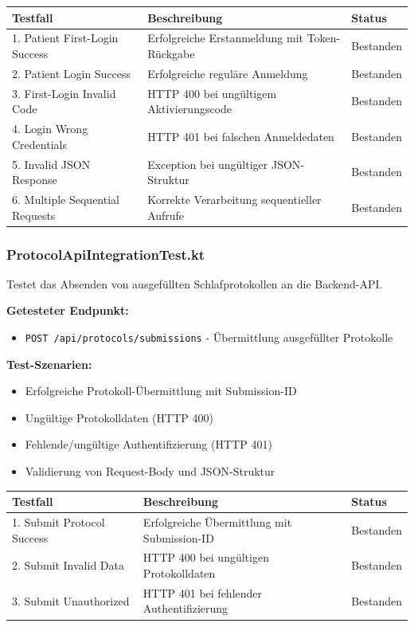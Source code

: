\begin{tabularx}{\textwidth}{|l|X|l|}
\hline
\textbf{Testfall} & \textbf{Beschreibung} & \textbf{Status} \\
\hline
1. Patient First-Login Success & Erfolgreiche Erstanmeldung mit Token-Rückgabe & Bestanden\\
\hline
2. Patient Login Success & Erfolgreiche reguläre Anmeldung & Bestanden\\
\hline
3. First-Login Invalid Code & HTTP 400 bei ungültigem Aktivierungscode & Bestanden\\
\hline
4. Login Wrong Credentials & HTTP 401 bei falschen Anmeldedaten & Bestanden\\
\hline
5. Invalid JSON Response & Exception bei ungültiger JSON-Struktur & Bestanden\\
\hline
6. Multiple Sequential Requests & Korrekte Verarbeitung sequentieller Aufrufe & Bestanden\\
\hline
\end{tabularx}

\subsubsection{ProtocolApiIntegrationTest.kt}
Testet das Absenden von ausgefüllten Schlafprotokollen an die Backend-API.

\textbf{Getesteter Endpunkt:}
\begin{itemize}
  \item \texttt{POST /api/protocols/submissions} - Übermittlung ausgefüllter Protokolle
\end{itemize}

\textbf{Test-Szenarien:}
\begin{itemize}
  \item Erfolgreiche Protokoll-Übermittlung mit Submission-ID
  \item Ungültige Protokolldaten (HTTP 400)
  \item Fehlende/ungültige Authentifizierung (HTTP 401)
  \item Validierung von Request-Body und JSON-Struktur
\end{itemize}

\begin{tabularx}{\textwidth}{|l|X|l|}
\hline
\textbf{Testfall} & \textbf{Beschreibung} & \textbf{Status} \\
\hline
1. Submit Protocol Success & Erfolgreiche Übermittlung mit Submission-ID & Bestanden\\
\hline
2. Submit Invalid Data & HTTP 400 bei ungültigen Protokolldaten & Bestanden\\
\hline
3. Submit Unauthorized & HTTP 401 bei fehlender Authentifizierung & Bestanden\\
\hline
\end{tabularx}

